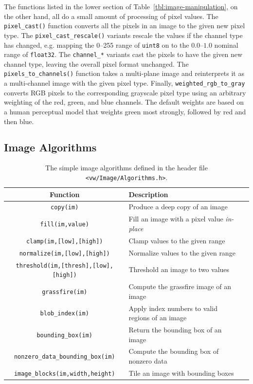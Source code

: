 The functions listed in the lower section of Table~\ref{tbl:image-manipulation}, 
on the other hand, all do a small amount of processing of pixel values.  
The \verb#pixel_cast()# function converts all the pixels in an image to the 
given new pixel type.  The \verb#pixel_cast_rescale()# variants rescale the 
values if the channel type has changed, e.g. mapping the 0--255 range of 
\verb#uint8# on to the $0.0$--$1.0$ nominal range of \verb#float32#.  The 
\verb#channel_*# variants cast the pixels to have the given new channel type, 
leaving the overall pixel format unchanged.  The \verb#pixels_to_channels()# 
function takes a multi-plane image and reinterprets it as a multi-channel 
image with the given pixel type.  Finally, \verb#weighted_rgb_to_gray# converts 
RGB pixels to the corresponding grayscale pixel type using an arbitrary 
weighting of the red, green, and blue channels.  The default weights are 
based on a human perceptual model that weights green most strongly, followed 
by red and then blue.

\subsection{Image Algorithms}

\begin{table}[t]\begin{centering}
\begin{tabular}{|c|l|l|} \hline
Function & Description \\ \hline \hline
\verb#copy(im)# & Produce a deep copy of an image \\ \hline
\verb#fill(im,value)# & Fill an image with a pixel value {\it in-place} \\ \hline
\verb#clamp(im,[low],[high])# & Clamp values to the given range \\ \hline
\verb#normalize(im,[low],[high])# & Normalize values to the given range \\ \hline
\verb#threshold(im,[thresh],[low],[high])# & Threshold an image to two values \\ \hline
\verb#grassfire(im)# & Compute the grassfire image of an image \\ \hline
\verb#blob_index(im)# & Apply index numbers to valid regions of an image \\ \hline
\verb#bounding_box(im)# & Return the bounding box of an image \\ \hline
\verb#nonzero_data_bounding_box(im)# & Compute the bounding box of nonzero data \\ \hline
\verb#image_blocks(im,width,height)# & Tile an image with bounding boxes \\ \hline
\end{tabular}
\caption{The simple image algorithms defined in the header file {\tt <vw/Image/Algorithms.h>}.}
\label{tbl:image-algorithms}
\end{centering}\end{table}

